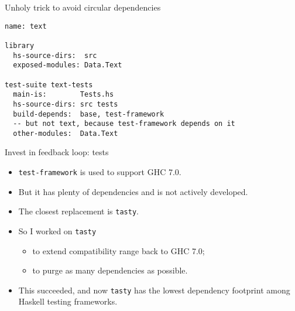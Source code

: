 \documentclass[handout]{beamer}
\begin{document}
\begin{frame}[fragile]{Unholy trick to avoid circular dependencies}

\begin{lstlisting}[language=Cabal]
name: text

library
  hs-source-dirs:  src
  exposed-modules: Data.Text

test-suite text-tests
  main-is:        Tests.hs
  hs-source-dirs: src tests
  build-depends:  base, test-framework
  -- but not text, because test-framework depends on it
  other-modules:  Data.Text
\end{lstlisting}

\end{frame}

\begin{frame}{Invest in feedback loop: tests}

\begin{itemize}
\item {\tt test-framework} is used to support GHC 7.0.
\pause
\item But it has plenty of dependencies and is not actively developed.
\pause
\item The closest replacement is {\tt tasty}.

\pause

\item
So I worked on {\tt tasty}
  \begin{itemize}
  \item to extend compatibility range back to GHC 7.0;
  \item to purge as many dependencies as possible.
  \end{itemize}

\pause

\item This succeeded, and now {\tt tasty} has the lowest dependency footprint
among Haskell testing frameworks.

\end{itemize}

\end{frame}
\end{document}
